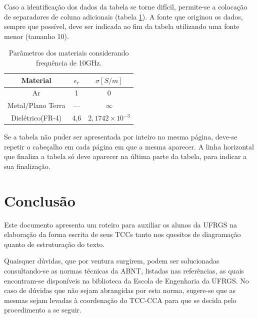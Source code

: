\documentclass[repeatfields,xlists,xpacks,oneside,yearsonly]{ufrgscca}
\begin{document}
Caso a identificação dos dados da tabela se torne difícil, permite-se a
colocação de separadores de coluna adicionais (tabela \ref{tabvert}). A fonte que
originou os dados, sempre que possível, deve ser indicada ao fim da tabela
utilizando uma fonte menor (tamanho 10).

\begin{table}[htb]
  \begin{center}
  \caption{Parâmetros dos materiais considerando frequência de 10GHz.}\label{tabvert}
  \begin{tabular}{c|c|c}
  \hline
  Material		& $\epsilon_r$	& $\sigma[S/m]$\\
  \hline
  Ar			& 1		& 0\\
  Metal/Plano Terra 	& --- 		& $\infty$\\
  Dielétrico(FR-4) 	& 4,6		& $2,1742\times10^{-3}$\\
  \hline
  \end{tabular}
	\end{center}
{}
\end{table}

Se a tabela não puder ser apresentada por inteiro no mesma página, deve-se
repetir o cabeçalho em cada página em que a mesma aparecer. A linha horizontal que
finaliza a tabela só deve aparecer na última parte da tabela, para indicar a
sua finalização.


\chapter{Conclusão}
\label{conclusao}

Este documento apresenta um roteiro para auxiliar os
alunos da UFRGS na elaboração da forma escrita de seus TCCs
 tanto nos quesitos de diagramação quanto de
estruturação do texto.

Quaisquer dúvidas, que por ventura surgirem, podem ser solucionadas
consultando-se as normas técnicas da ABNT, listadas nas referências, as
quais encontram-se disponíveis na biblioteca da Escola de Engenharia da
UFRGS. No caso de dúvidas que não sejam abrangidas por esta norma, sugere-se
que as mesmas sejam levadas à coordenação do TCC-CCA para que se decida pelo
procedimento a se seguir.


\printbibliography
\end{document}
